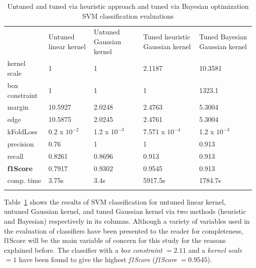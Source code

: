 %
\begin{table}
	\centering
\caption{Untuned and tuned via heuristic approach and tuned via Bayesian optimization SVM classification evaluations}
\label{tab:stuck}       %
\begin{tabular}{p{2.7cm}p{2.0cm}p{2.3cm}p{3cm}p{3cm}}
\hline\noalign{\smallskip}
 & Untuned linear kernel & Untuned Gaussian kernel & Tuned heuristic Gaussian kernel & Tuned Bayesian Gaussian kernel\\
\noalign{\smallskip}\hline\noalign{\smallskip}
kernel scale & 1 & 1 & 2.1187 & 10.3581 \\
box constraint & 1 & 1 & 1 & 1323.1 \\
margin & 10.5927 & 2.0248 & 2.4763 & 5.3004 \\
edge & 10.5875 & 2.0245 & 2.4761 & 5.3004 \\
kFoldLoss & 0.2 x $10^{-2}$ & 1.2 x $10^{-3}$& 7.571 x $10^{-4}$ & 1.2 x $10^{-3}$ \\
precision & 0.76 & 1 & 1 & 0.913 \\
recall & 0.8261 & 0.8696 & 0.913 & 0.913\\
\textbf{f1Score} & 0.7917 & 0.9302 &0.9545 & 0.913 \\
comp. time & 3.75s & 3.4s & 5917.5s & 1784.7s \\
\noalign{\smallskip}\hline
\end{tabular}
\end{table}


Table~\ref{tab:stuck} shows the results of SVM classification for untuned linear kernel, untuned Gaussian kernel, and tuned Gaussian kernel via two methods (heuristic and Bayesian) respectively in its columns.  
Although a variety of variables used in the evaluation of classifiers have been presented to the reader for completeness, f1Score will be the main variable of concern for this study for the reasons explained before. 
The classifier with a \emph{box constraint} $= 2.11$ and a \emph{kernel scale} $ = 1$ have been found to give the highest \emph{f1Score} (\emph{f1Score} $= 0.9545$). 

